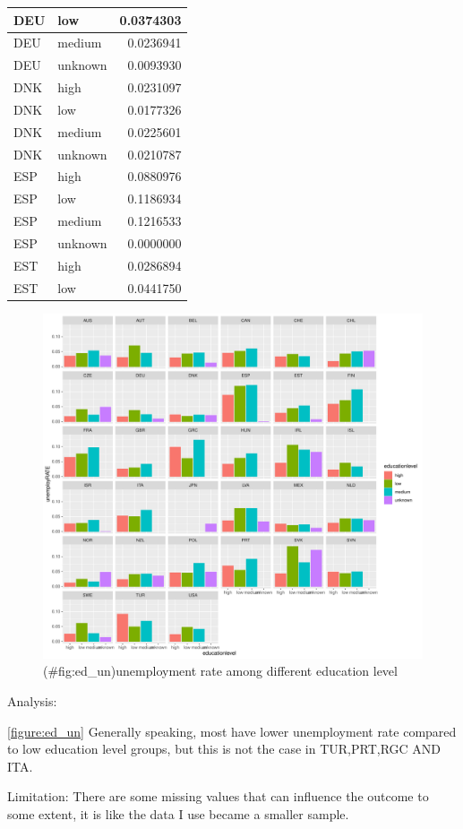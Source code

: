 \documentclass[11pt,a4paper,]{article}
\begin{document}
\begin{table}
\begin{tabular}[t]{l|l|r}
\hline
DEU & low & 0.0374303\\
\hline
DEU & medium & 0.0236941\\
\hline
DEU & unknown & 0.0093930\\
\hline
DNK & high & 0.0231097\\
\hline
DNK & low & 0.0177326\\
\hline
DNK & medium & 0.0225601\\
\hline
DNK & unknown & 0.0210787\\
\hline
ESP & high & 0.0880976\\
\hline
ESP & low & 0.1186934\\
\hline
ESP & medium & 0.1216533\\
\hline
ESP & unknown & 0.0000000\\
\hline
EST & high & 0.0286894\\
\hline
EST & low & 0.0441750\\
\hline
\end{tabular}
\end{table}

\pagebreak

\begin{figure}
\centering
\includegraphics{ETC5513assignment4_files/figure-latex/ed_un-1.pdf}
\caption{(\#fig:ed\_un)unemployment rate among different education level}
\end{figure}

Analysis:

\ref{figure:ed_un} Generally speaking, most have lower unemployment rate compared to low education level groups, but this is not the case in TUR,PRT,RGC AND ITA.

Limitation:
There are some missing values that can influence the outcome to some extent, it is like the data I use became a smaller sample.

\nocite{*}

\printbibliography
\end{document}
